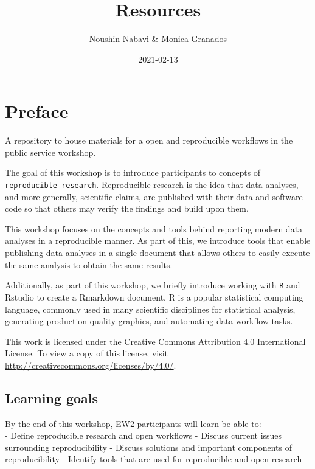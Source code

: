 \documentclass[
  12pt,
]{book}
\title{Resources}
\author{Noushin Nabavi \& Monica Granados}
\date{2021-02-13}
\begin{document}
\maketitle

{
\hypersetup{linkcolor=}
\setcounter{tocdepth}{1}
\tableofcontents
}
\listoftables
\listoffigures
\hypertarget{preface}{%
\chapter{Preface}\label{preface}}

A repository to house materials for a open and reproducible workflows in the public service workshop.

The goal of this workshop is to introduce participants to concepts of \texttt{reproducible\ research}.
Reproducible research is the idea that data analyses, and more generally, scientific claims, are published with their data and software code so that others may verify the findings and build upon them.

This workshop focuses on the concepts and tools behind reporting modern data analyses in a reproducible manner. As part of this, we introduce tools that enable publishing data analyses in a single document that allows others to easily execute the same analysis to obtain the same results.

Additionally, as part of this workshop, we briefly introduce working with \texttt{R} and Rstudio to create a Rmarkdown document. R is a popular statistical computing language, commonly used in many scientific disciplines for statistical analysis, generating production-quality graphics, and automating data workflow tasks.

This work is licensed under the Creative Commons Attribution 4.0 International License.
To view a copy of this license, visit \url{http://creativecommons.org/licenses/by/4.0/}.

\hypertarget{learning-goals}{%
\section{Learning goals}\label{learning-goals}}

By the end of this workshop, EW2 participants will learn be able to:\\
- Define reproducible research and open workflows
- Discuss current issues surrounding reproducibility
- Discuss solutions and important components of reproducibility
- Identify tools that are used for reproducible and open research
\end{document}
